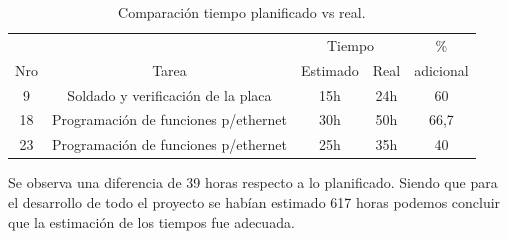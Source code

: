 \begin{table}[hp]
  \begin{tabular}{|c|c|c|c|c|}
    \hline
       &       & \multicolumn{2}{c|}{ Tiempo} & \%  \\ \cline{3-4}
    Nro& Tarea &       Estimado &  Real       & adicional \\
    \hline
    9 & Soldado y verificación de la placa & 15h & 24h & 60 \\
    18 & Programación de funciones p/ethernet & 30h & 50h & 66,7 \\
    23 & Programación de funciones p/ethernet & 25h & 35h & 40 \\
    \hline \hline
  \end{tabular}
  \caption{Comparación tiempo planificado vs real.}
  \label{tab:update_task}
\end{table}

Se observa una diferencia de 39 horas respecto a lo planificado. Siendo que para el desarrollo de todo el proyecto se habían estimado 617 horas podemos concluir que la estimación de los tiempos fue adecuada. 


